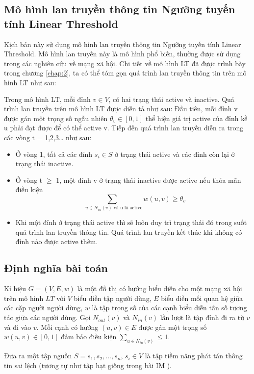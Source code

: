 \subsection{Mô hình lan truyền thông tin Ngưỡng tuyến tính Linear Threshold}
Kịch bản này sử dụng mô hình lan truyền thông tin Ngưỡng tuyến tính Linear Threshold. Mô hình lan truyền này là mô hình phổ biến, thường được sử dụng trong các nghiên cứu về mạng xã hội. Chi tiết về mô hình LT đã được trình bày trong chương \ref{chap:2}, ta có thể tóm gọn quá trình lan truyền thông tin trên mô hình LT như sau:

Trong mô hình LT, mỗi đỉnh $v \in V$, có hai trạng thái active và inactive. Quá trình lan truyền trên mô hình LT được diễn tả như sau: Đầu tiên, mỗi đỉnh v được gán một trọng số ngẫu nhiên $\theta_{v} \in [0,1]$ thể hiện giá trị active của đỉnh kề u phải đạt được để có thể active v. Tiếp đến quá trình lan truyền diễn ra trong các vòng t = 1,2,3… như sau: 		
\begin {itemize}
\item Ở vòng 1, tất cả các đỉnh $s_{i} \in S$ ở trạng thái active và các đỉnh còn lại ở trạng thái inactive.

\item Ở vòng t $\ge$ 1, một đỉnh v ở trạng thái inactive được active nếu thỏa mãn điều kiện $$\sum_{\mbox{ $u \in N_{in}(v) $ và  u  là active}} w(u, v)\geq \theta_v$$

\item Khi một đỉnh ở trạng thái active thì sẽ luôn duy trì trạng thái đó trong suốt quá trình lan truyền thông tin. Quá trình lan truyền kết thúc khi không có đỉnh nào được active thêm.	
\end {itemize}

\subsection{Định nghĩa bài toán}
Kí hiệu $G = (V, E, w)$ là một đồ thị có hướng biểu diễn cho một mạng xã hội trên mô hình $LT$ với $V$ biểu diễn tập người dùng, $E$ biểu diễn mối quan hệ giữa các cặp người người dùng, $w$ là tập trọng số của các cạnh biểu diễn tần số tương tác giữa các người dùng. Gọi $N_{out}(v)$ và $N_{in}(v)$ lần lượt là tập đỉnh đi ra từ $v$ và đi vào $v$. Mỗi cạnh có hướng $(u,v) \in E$ được gán một trọng số $w(u,v) \in [0,1]$ đảm bảo điều kiện $\sum_{u \in N_{in}(v)} \leq 1$.

Đưa ra một tập nguồn $S = {s_{1}, s_{2}, ... , s_{n}}$, $s_{i} \in V$ là tập tiềm năng phát tán thông tin sai lệch (tương tự như tập hạt giống trong bài IM \cite{kemple2}).

